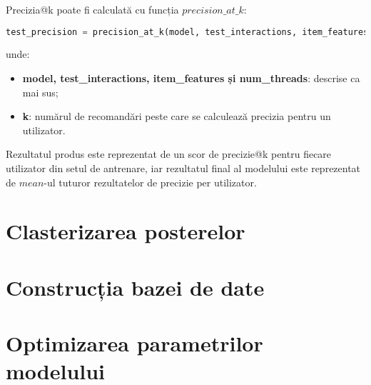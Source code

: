 Precizia@k poate fi calculată cu funcția $precision\_at\_k$:

\begin{lstlisting}[language=Python, caption=Precizia@k a unui model]
test_precision = precision_at_k(model, test_interactions, item_features=item_features, k=k, num_threads=threads).mean()
\end{lstlisting}
unde:
\begin{itemize}
	\item \textbf{model, test\_interactions, item\_features și num\_threads}: descrise ca mai sus;
	\item \textbf{k}: numărul de recomandări peste care se calculează precizia pentru un utilizator.
\end{itemize}
Rezultatul produs este reprezentat de un scor de precizie@k pentru fiecare utilizator din setul de antrenare, iar rezultatul final al modelului este reprezentat de $mean$-ul tuturor rezultatelor de precizie per utilizator.

\section{Clasterizarea posterelor}

\section{Construcția bazei de date}

\section{Optimizarea parametrilor modelului}

